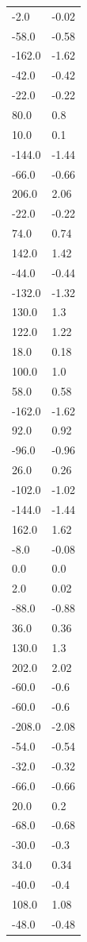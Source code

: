 \begin{longtable}{ll}
-2.0 & -0.02 \\
-58.0 & -0.58 \\
-162.0 & -1.62 \\
-42.0 & -0.42 \\
-22.0 & -0.22 \\
80.0 & 0.8 \\
10.0 & 0.1 \\
-144.0 & -1.44 \\
-66.0 & -0.66 \\
206.0 & 2.06 \\
-22.0 & -0.22 \\
74.0 & 0.74 \\
142.0 & 1.42 \\
-44.0 & -0.44 \\
-132.0 & -1.32 \\
130.0 & 1.3 \\
122.0 & 1.22 \\
18.0 & 0.18 \\
100.0 & 1.0 \\
58.0 & 0.58 \\
-162.0 & -1.62 \\
92.0 & 0.92 \\
-96.0 & -0.96 \\
26.0 & 0.26 \\
-102.0 & -1.02 \\
-144.0 & -1.44 \\
162.0 & 1.62 \\
-8.0 & -0.08 \\
0.0 & 0.0 \\
2.0 & 0.02 \\
-88.0 & -0.88 \\
36.0 & 0.36 \\
130.0 & 1.3 \\
202.0 & 2.02 \\
-60.0 & -0.6 \\
-60.0 & -0.6 \\
-208.0 & -2.08 \\
-54.0 & -0.54 \\
-32.0 & -0.32 \\
-66.0 & -0.66 \\
20.0 & 0.2 \\
-68.0 & -0.68 \\
-30.0 & -0.3 \\
34.0 & 0.34 \\
-40.0 & -0.4 \\
108.0 & 1.08 \\
-48.0 & -0.48 \\

\end{longtable}
